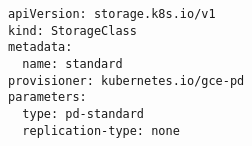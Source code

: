\begin{verbatim}
apiVersion: storage.k8s.io/v1
kind: StorageClass
metadata:
  name: standard
provisioner: kubernetes.io/gce-pd
parameters:
  type: pd-standard
  replication-type: none
\end{verbatim}
